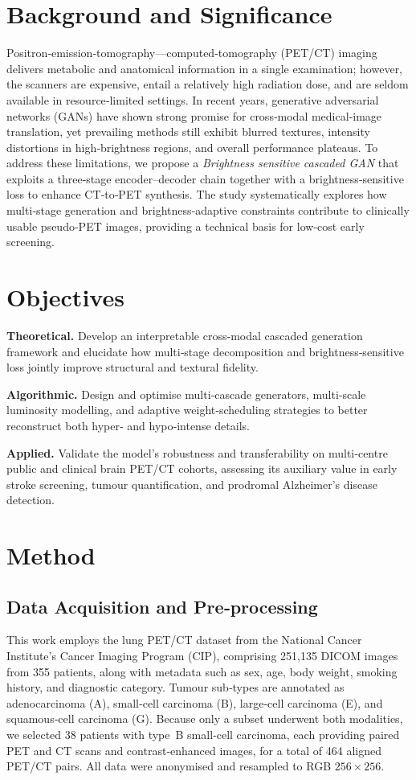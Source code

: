 \documentclass[twocolumn]{article}
\begin{document}
\section{Background and Significance}
Positron‑emission‑tomography––computed‑tomography (PET/CT) imaging delivers metabolic and anatomical information in a single examination; however, the scanners are expensive, entail a relatively high radiation dose, and are seldom available in resource‑limited settings. In recent years, generative adversarial networks (GANs) have shown strong promise for cross‑modal medical‑image translation, yet prevailing methods still exhibit blurred textures, intensity distortions in high‑brightness regions, and overall performance plateaus. To address these limitations, we propose a \emph{Brightness sensitive cascaded GAN} that exploits a three‑stage encoder–decoder chain together with a brightness‑sensitive loss to enhance CT‑to‑PET synthesis. The study systematically explores how multi‑stage generation and brightness‑adaptive constraints contribute to clinically usable pseudo‑PET images, providing a technical basis for low‑cost early screening.

\section{Objectives}
\textbf{Theoretical.} Develop an interpretable cross‑modal cascaded generation framework and elucidate how multi‑stage decomposition and brightness‑sensitive loss jointly improve structural and textural fidelity.

\textbf{Algorithmic.} Design and optimise multi‑cascade generators, multi‑scale luminosity modelling, and adaptive weight‑scheduling strategies to better reconstruct both hyper‑ and hypo‑intense details.

\textbf{Applied.} Validate the model’s robustness and transferability on multi‑centre public and clinical brain PET/CT cohorts, assessing its auxiliary value in early stroke screening, tumour quantification, and prodromal Alzheimer’s disease detection.

\section{Method}
\subsection{Data Acquisition and Pre‑processing}
This work employs the lung PET/CT dataset from the National Cancer Institute’s Cancer Imaging Program (CIP), comprising 251,135 DICOM images from 355 patients, along with metadata such as sex, age, body weight, smoking history, and diagnostic category. Tumour sub‑types are annotated as adenocarcinoma (A), small‑cell carcinoma (B), large‑cell carcinoma (E), and squamous‑cell carcinoma (G). Because only a subset underwent both modalities, we selected 38 patients with type B small‑cell carcinoma, each providing paired PET and CT scans and contrast‑enhanced images, for a total of 464 aligned PET/CT pairs. All data were anonymised and resampled to RGB $256\times256$.
\end{document}
